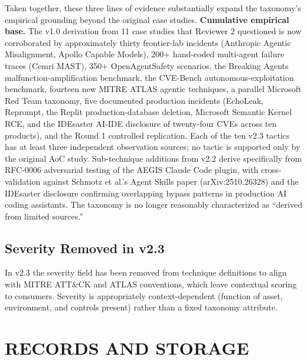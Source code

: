 \documentclass{IEEEoj-data}
\newcommand{\replaced}[2]{#1}
\newcommand{\added}[1]{#1}
\newcommand{\deleted}[1]{}
\begin{document}
\added{Taken together, these three lines of evidence substantially expand the taxonomy's empirical grounding beyond the original case studies. {\bf Cumulative empirical base.} The v1.0 derivation from 11 case studies that Reviewer 2 questioned is now corroborated by approximately thirty frontier-lab incidents (Anthropic Agentic Misalignment, Apollo Capable Models), 200+ hand-coded multi-agent failure traces (Cemri MAST), 350+ OpenAgentSafety scenarios, the Breaking Agents malfunction-amplification benchmark, the CVE-Bench autonomous-exploitation benchmark, fourteen new MITRE ATLAS agentic techniques, a parallel Microsoft Red Team taxonomy, five documented production incidents (EchoLeak, Reprompt, the Replit production-database deletion, Microsoft Semantic Kernel RCE, and the IDEsaster AI-IDE disclosure of twenty-four CVEs across ten products), and the Round 1 controlled replication. Each of the ten v2.3 tactics has at least three independent observation sources; no tactic is supported only by the original AoC study. Sub-technique additions from v2.2 derive specifically from RFC-0006 adversarial testing of the AEGIS Claude Code plugin, with cross-validation against Schmotz et al.'s Agent Skills paper (arXiv:2510.26328) and the IDEsaster disclosure confirming overlapping bypass patterns in production AI coding assistants. The taxonomy is no longer reasonably characterized as ``derived from limited sources.''}

\subsection*{\replaced{Severity Removed in v2.3}{Severity Distribution}}

\deleted{The 20 techniques distribute across severity levels as follows: critical (6), high (9), medium (4), low (1). This distribution reflects the empirical finding that most ungoverned agent behaviors have high or critical impact potential.}

\added{In v2.3 the severity field has been removed from technique definitions to align with MITRE ATT\&CK and ATLAS conventions, which leave contextual scoring to consumers. Severity is appropriately context-dependent (function of asset, environment, and controls present) rather than a fixed taxonomy attribute.}


\section*{RECORDS AND STORAGE}
\end{document}
